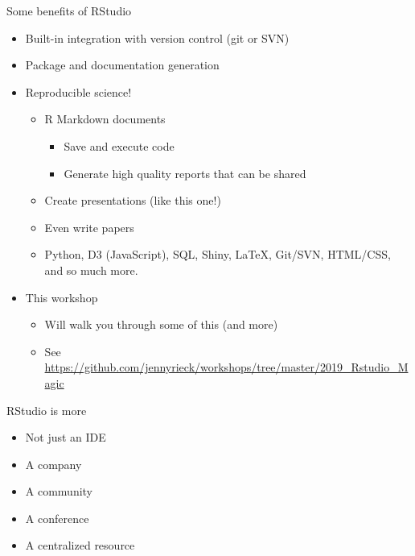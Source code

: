 \documentclass[
  ignorenonframetext,
]{beamer}
\providecommand{\tightlist}{%
  \setlength{\itemsep}{0pt}\setlength{\parskip}{0pt}}
\begin{document}
\begin{frame}{Some benefits of RStudio}
\protect\hypertarget{some-benefits-of-rstudio}{}

\begin{itemize}
\tightlist
\item
  Built-in integration with version control (git or SVN)
\item
  Package and documentation generation
\item
  Reproducible science!

  \begin{itemize}
  \tightlist
  \item
    R Markdown documents

    \begin{itemize}
    \tightlist
    \item
      Save and execute code
    \item
      Generate high quality reports that can be shared
    \end{itemize}
  \item
    Create presentations (like this one!)
  \item
    Even write papers
  \item
    Python, D3 (JavaScript), SQL, Shiny, LaTeX, Git/SVN, HTML/CSS, and
    so much more.
  \end{itemize}
\item
  This workshop

  \begin{itemize}
  \tightlist
  \item
    Will walk you through some of this (and more)
  \item
    See
    \url{https://github.com/jennyrieck/workshops/tree/master/2019_Rstudio_Magic}
  \end{itemize}
\end{itemize}

\end{frame}

\begin{frame}{RStudio is more}
\protect\hypertarget{rstudio-is-more}{}

\begin{itemize}
\tightlist
\item
  Not just an IDE
\item
  A company
\item
  A community
\item
  A conference
\item
  A centralized resource
\end{itemize}

\end{frame}
\end{document}
